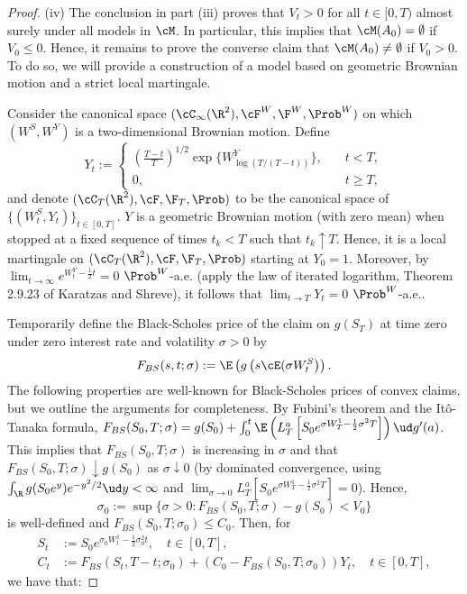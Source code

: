 \documentclass[11pt]{article}
\begin{document}
\begin{proof}
\item (iv) The conclusion in part (iii) proves that $V_t > 0$ for all $t \in [0,T)$ almost surely under all models in $\cM$. In particular, this implies that $\cM(A_0) = \emptyset$ if $V_0 \leq 0$. Hence, it remains to prove the converse claim that $\cM(A_0) \neq \emptyset$ if $V_0 > 0$. To do so, we will provide a construction of a model based on geometric Brownian motion and a strict local martingale.

Consider the canonical space $(\cC_\infty(\R^2),\cF^W,\F^W,\Prob^W)$ on which $(W^S,W^Y)$ is a two-dimensional Brownian motion. Define
$$
Y_t := 
\begin{cases}
\left(\frac{T-t}{T}\right)^{1/2} \exp\{W^Y_{\log(T/(T-t))}\}, \quad& t < T, \\
0, & t \geq T,
\end{cases}
$$
and denote $(\cC_T(\R^2), \cF, \F_T, \Prob)$ to be the canonical space of $\{ (W^S_t, Y_t) \}_{t \in [0,T]}$. $Y$ is a geometric Brownian motion (with zero mean) when stopped at a fixed sequence of times $t_k < T$ such that $t_k \uparrow T$. Hence, it is a local martingale on $(\cC_T(\R^2), \cF, \F_T, \Prob)$ starting at $Y_0 = 1$. Moreover, by $\lim_{t \to \infty} e^{W^Y_t - \frac{1}{2}t} = 0$ $\Prob^W$-a.e. (apply the law of iterated logarithm, Theorem 2.9.23 of Karatzas and Shreve), it follows that $\lim_{t \to T} Y_t = 0$ $\Prob^W$-a.e.. 

Temporarily define the Black-Scholes price of the claim on $g(S_T)$ at time zero under zero interest rate and volatility $\sigma > 0$ by 
$$
F_{BS}(s,t;\sigma) := \E \left( g \left( s \cE( \sigma W^S_t \right) \right).
$$
The following properties are well-known for Black-Scholes prices of convex claims, but we outline the arguments for completeness. By Fubini's theorem and the It\^o-Tanaka formula, $F_{BS}(S_0,T; \sigma) = g(S_0) + \int_0^t \E \left( L^a_T\left[S_0  e^{ \sigma W^1_T - \frac{1}{2} \sigma^2 T }\right] \right) \ud g^\prime(a)$. This implies that $F_{BS}(S_0,T; \sigma)$ is increasing in $\sigma$ and that $F_{BS}(S_0, T; \sigma) \downarrow g(S_0)$ as $\sigma \downarrow 0$ (by dominated convergence, using $\int_\R g(S_0 e^{y}) e^{-y^2/2} \ud y < \infty$ and $\lim_{\sigma \to 0} L^a_T\left[S_0  e^{ \sigma W^1_T - \frac{1}{2} \sigma^2 T }\right] = 0$). Hence,
$$
\sigma_0 := \sup\{ \sigma > 0 : F_{BS}(S_0, T; \sigma) - g(S_0) < V_0 \}
$$
is well-defined and $F_{BS}(S_0, T; \sigma_0) \leq C_0$. Then, for
\begin{align*}
S_t &:= S_0 e^{ \sigma_0 W^1_t - \frac{1}{2} \sigma_0^2 t }, \quad t \in [0,T], \\
C_t &:= F_{BS}(S_t, T-t; \sigma_0) + (C_0 - F_{BS}(S_0, T; \sigma_0)) Y_t, \quad t \in [0,T],
\end{align*}
we have that:


\end{proof}
\end{document}
